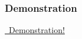   \begin{frame}
    \frametitle{Demonstration}
    \centering
    \href{https://asciinema.org/a/86989}{\HUGE \textcolor{solarizedOrange}{\faPlayCircle\, Demonstration!}}
  \end{frame}
